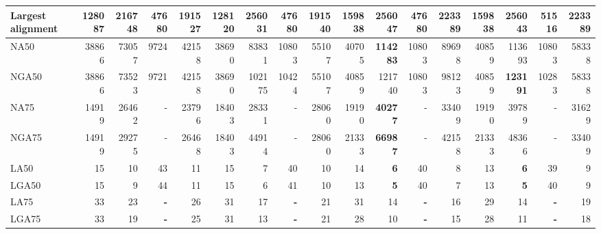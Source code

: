 \documentclass[12pt,a4paper]{article}
\begin{document}
\begin{table}[ht]
\begin{center}
\begin{tabular}{|l*{16}{|r}|}
Largest alignment & 128087 & 216748 & 47680 & 191527 & 128120 & 256031 & 47680 & 191540 & 159838 & {\bf 256047} & 47680 & 223389 & 159838 & 256043 & 51516 & 223389 \\ \hline
NA50 & 38866 & 73057 & 9724 & 42158 & 38690 & 83831 & 10803 & 55107 & 40705 & {\bf 114283} & 10803 & 89698 & 40859 & 113693 & 10803 & 58338 \\ \hline
NGA50 & 38866 & 73523 & 9721 & 42158 & 38690 & 102175 & 10424 & 55107 & 40859 & 121740 & 10803 & 98123 & 40859 & {\bf 123191} & 10283 & 58338 \\ \hline
NA75 & 14919 & 26462 & - & 23796 & 18403 & 28331 & - & 28060 & 19190 & {\bf 40277} & - & 33409 & 19190 & 39789 & - & 31629 \\ \hline
NGA75 & 14919 & 29275 & - & 26468 & 18403 & 44914 & - & 28060 & 21333 & {\bf 66987} & - & 42158 & 21333 & 48366 & - & 33409 \\ \hline
LA50 & 15 & 10 & 43 & 11 & 15 & 7 & 40 & 10 & 14 & {\bf 6} & 40 & 8 & 13 & {\bf 6} & 39 & 9 \\ \hline
LGA50 & 15 & 9 & 44 & 11 & 15 & 6 & 41 & 10 & 13 & {\bf 5} & 40 & 7 & 13 & {\bf 5} & 40 & 9 \\ \hline
LA75 & 33 & 23 & {\bf -} & 26 & 31 & 17 & {\bf -} & 21 & 31 & 14 & {\bf -} & 16 & 29 & 14 & {\bf -} & 19 \\ \hline
LGA75 & 33 & 19 & {\bf -} & 25 & 31 & 13 & {\bf -} & 21 & 28 & 10 & {\bf -} & 15 & 28 & 11 & {\bf -} & 18 \\ \hline
\end{tabular}
\end{center}
\end{table}
\end{document}
